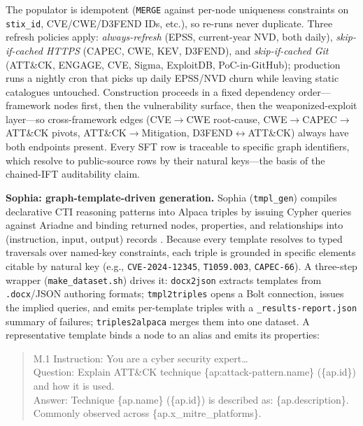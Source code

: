 \documentclass[conference]{IEEEtran}
\providecommand{\hfid}[1]{{\small\nolinkurl{#1}}}
\begin{document}
The populator is idempotent (\texttt{MERGE} against per-node uniqueness constraints on \hfid{stix_id}, CVE/CWE/D3FEND IDs, etc.), so re-runs never duplicate. Three refresh policies apply: \emph{always-refresh} (EPSS, current-year NVD, both daily), \emph{skip-if-cached HTTPS} (CAPEC, CWE, KEV, D3FEND), and \emph{skip-if-cached Git} (ATT\&CK, ENGAGE, CVE, Sigma, ExploitDB, PoC-in-GitHub); production runs a nightly cron that picks up daily EPSS/NVD churn while leaving static catalogues untouched. Construction proceeds in a fixed dependency order---framework nodes first, then the vulnerability surface, then the weaponized-exploit layer---so cross-framework edges (CVE$\to$CWE root-cause, CWE$\to$CAPEC$\to$ATT\&CK pivots, ATT\&CK$\to$Mitigation, D3FEND$\leftrightarrow$ATT\&CK) always have both endpoints present. Every SFT row is traceable to specific graph identifiers, which resolve to public-source rows by their natural keys---the basis of the chained-IFT auditability claim.

\textbf{Sophia: graph-template-driven generation.} Sophia (\hfid{tmpl_gen}) compiles declarative CTI reasoning patterns into Alpaca triples by issuing Cypher queries against Ariadne and binding returned nodes, properties, and relationships into (instruction, input, output) records \cite{cardei2025ift}. Because every template resolves to typed traversals over named-key constraints, each triple is grounded in specific elements citable by natural key (e.g., \hfid{CVE-2024-12345}, \texttt{T1059.003}, \hfid{CAPEC-66}). A three-step wrapper (\hfid{make_dataset.sh}) drives it: \texttt{docx2json} extracts templates from \texttt{.docx}/JSON authoring formats; \texttt{tmpl2triples} opens a Bolt connection, issues the implied queries, and emits per-template triples with a \hfid{_results-report.json} summary of failures; \texttt{triples2alpaca} merges them into one dataset. A representative template binds a node to an alias and emits its properties:

\begin{quote}\scriptsize\ttfamily\sloppy\setlength{\rightskip}{0pt plus 2em}\noindent
M.1 Instruction: You are a cyber security expert\ldots\\
Question: Explain ATT\&CK technique \{ap:attack-pattern.name\} (\{ap.id\}) and how it is used.\\
Answer: Technique \{ap.name\} (\{ap.id\}) is described as: \{ap.description\}. Commonly observed across \{ap.x\_mitre\_platforms\}.
\end{quote}
\end{document}
